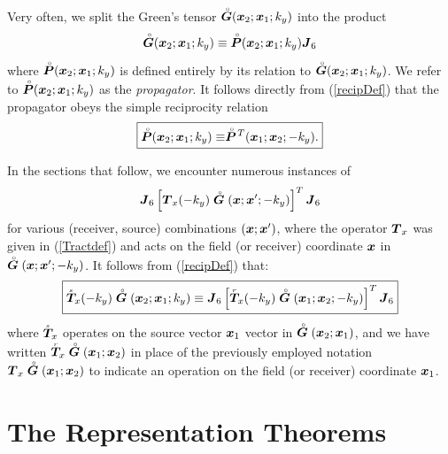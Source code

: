 Very often, we split the Green's tensor ${\rf{\bmi  G}}({\bmi 
x}_{2};{\bmi x}_{1}; k_y)$ into the product 
\[
{\rf{\bmi  G}}({\bmi 
x}_{2};{\bmi x}_{1}; k_y)\equiv {\rf{\bmi  P}}({\bmi 
x}_{2};{\bmi x}_{1}; k_y){\bmi J}_6
\]
where ${\rf{\bmi  P}}({\bmi 
x}_{2};{\bmi x}_{1}; k_y)$ is defined entirely by its relation to
${\rf{\bmi  G}}({\bmi 
x}_{2};{\bmi x}_{1}; k_y)$. We refer to ${\rf{\bmi  P}}({\bmi 
x}_{2};{\bmi x}_{1}; k_y)$ as the {\em propagator\/}. It follows directly 
from (\ref{recipDef}) that  the propagator 
obeys the simple reciprocity relation
\begin{equation}	\label{recipPDef}
\fbox{$ \displaystyle
{\rf{\bmi  P}}({\bmi x}_{2};{\bmi x}_{1};k_y) \equiv
\rf{\bmi  P}\!{}^{T}({\bmi x}_{1};{\bmi x}_{2};-k_y).
$}\end{equation}




In the sections that follow, we encounter numerous instances of
\[
{\bmi J}_{6}\left[{\bmi T}_{ x}(-k_y)
\rf{\bmi  G}({\bmi x};{\bmi x}^{\prime};-k_y)\right]^{T}{\bmi J}_{6}
\]
for various (receiver, source) combinations $({\bmi x};{\bmi x}^{\prime})$, 
where the operator ${\bmi T}_{ x}$ was given in (\ref{Tractdef}) and acts on the 
field (or receiver) coordinate ${\bmi x}$ in $\rf{\bmi  G}({\bmi x};{\bmi 
x}^{\prime};-k_y)$. It follows from (\ref{recipDef}) that:
\begin{equation}	\label{recipTDef}
\fbox{$ \displaystyle
\stackrel{\scriptscriptstyle _s}{\bmi T}{}_{\!\!\! x}(-k_y)
\rf{\bmi  G}{}({\bmi x}_{2};{\bmi x}_{1};k_y)\equiv
{\bmi J}_{6}\left[\stackrel{\scriptscriptstyle _r}{\bmi T}{}_{\!\!\! 
x}(-k_y)
\rf{\bmi  G}{}({\bmi x}_{1};{\bmi x}_{2};-k_y)\right]^{T}{\bmi J}_{6}
$}\end{equation}
where $\stackrel{\scriptscriptstyle _s}{\bmi T}{}_{\!\!\! x}$ operates on 
the source vector ${\bmi x}_{1}$ vector in $\rf{\bmi  G}({\bmi x}_{2};{\bmi x}_{1})$, and 
we have written $\stackrel{\scriptscriptstyle _r}{\bmi T}{}_{\!\!\! x}
\rf{\bmi  G}({\bmi x}_{1};{\bmi x}_{2})$ in place of the previously 
employed notation ${\bmi T}_{ x}\rf{\bmi  G}({\bmi x}_{1};{\bmi 
x}_{2})$ to indicate an operation on the field (or receiver) coordinate 
${\bmi x}_{1}$.


\section{The Representation Theorems}
